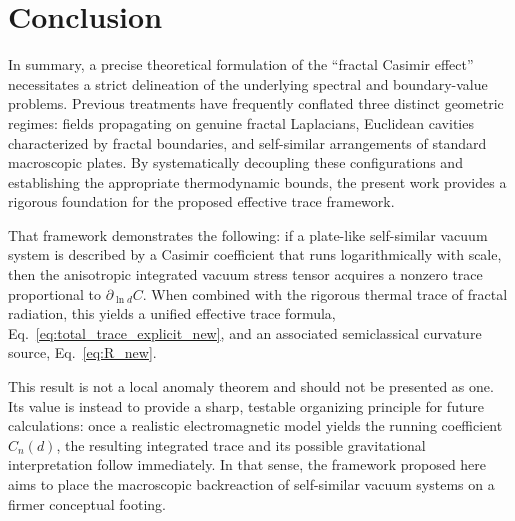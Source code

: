 \documentclass[12pt,letterpaper]{article}
\begin{document}
\section{Conclusion}
In summary, a precise theoretical formulation of the ``fractal Casimir effect'' necessitates a strict delineation of the underlying spectral and boundary-value problems.
Previous treatments have frequently conflated three distinct geometric regimes: fields propagating on genuine fractal Laplacians, Euclidean cavities characterized by fractal boundaries, and self-similar arrangements of standard macroscopic plates.
By systematically decoupling these configurations and establishing the appropriate thermodynamic bounds, the present work provides a rigorous foundation for the proposed effective trace framework.

That framework demonstrates the following: if a plate-like self-similar vacuum system is described by a Casimir coefficient that runs logarithmically with scale, then the anisotropic integrated vacuum stress tensor acquires a nonzero trace proportional to $\partial_{\ln d}C$.
When combined with the rigorous thermal trace of fractal radiation, this yields a unified effective trace formula, Eq.~\eqref{eq:total_trace_explicit_new}, and an associated semiclassical curvature source, Eq.~\eqref{eq:R_new}.

This result is not a local anomaly theorem and should not be presented as one.
Its value is instead to provide a sharp, testable organizing principle for future calculations: once a realistic electromagnetic model yields the running coefficient $C_n(d)$, the resulting integrated trace and its possible gravitational interpretation follow immediately.
In that sense, the framework proposed here aims to place the macroscopic backreaction of self-similar vacuum systems on a firmer conceptual footing.





\end{document}
